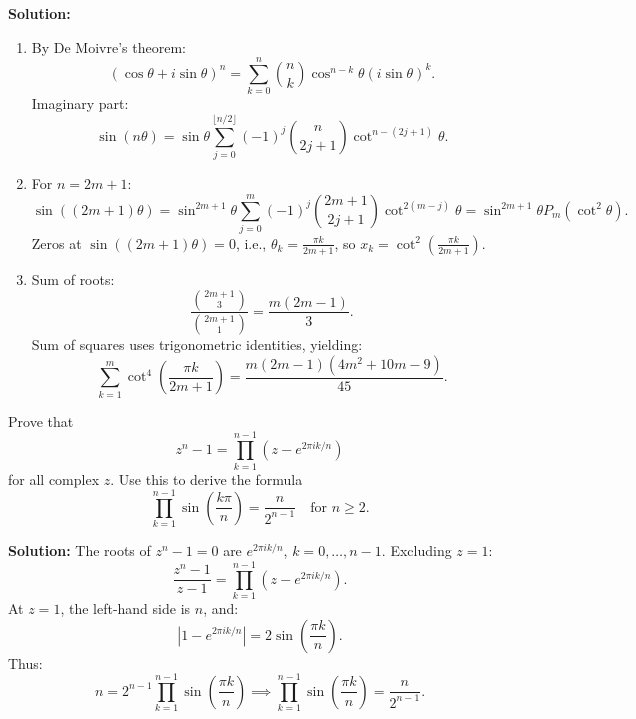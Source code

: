 \textbf{Solution:}
\begin{enumerate}[label=\textbf{(\alph*)}]
\item By De Moivre’s theorem:
\[
(\cos \theta + i \sin \theta)^n = \sum_{k=0}^n \binom{n}{k} \cos^{n-k} \theta (i \sin \theta)^k.
\]
Imaginary part:
\[
\sin(n\theta) = \sin \theta \sum_{j=0}^{\lfloor n/2 \rfloor} (-1)^j \binom{n}{2j+1} \cot^{n-(2j+1)} \theta.
\]
\item For \( n = 2m+1 \):
\[
\sin((2m+1)\theta) = \sin^{2m+1} \theta \sum_{j=0}^m (-1)^j \binom{2m+1}{2j+1} \cot^{2(m-j)} \theta = \sin^{2m+1} \theta P_m(\cot^2 \theta).
\]
Zeros at \( \sin((2m+1)\theta) = 0 \), i.e., \( \theta_k = \frac{\pi k}{2m+1} \), so \( x_k = \cot^2 \left( \frac{\pi k}{2m+1} \right) \).
\item Sum of roots:
\[
\frac{\binom{2m+1}{3}}{\binom{2m+1}{1}} = \frac{m(2m-1)}{3}.
\]
Sum of squares uses trigonometric identities, yielding:
\[
\sum_{k=1}^m \cot^4 \left( \frac{\pi k}{2m+1} \right) = \frac{m(2m-1)(4m^2 + 10m - 9)}{45}.
\]
\end{enumerate}

\begin{problembox}
Prove that
\[
z^n - 1 = \prod_{k=1}^{n-1} \left(z - e^{2\pi i k/n}\right)
\]
for all complex \( z \). Use this to derive the formula
\[
\prod_{k=1}^{n-1} \sin \left( \frac{k\pi}{n} \right) = \frac{n}{2^{n-1}} \quad \text{for } n \geq 2.
\]
\end{problembox}

\textbf{Solution:}
The roots of \( z^n - 1 = 0 \) are \( e^{2\pi i k/n} \), \( k = 0, \ldots, n-1 \). Excluding \( z = 1 \):
\[
\frac{z^n - 1}{z - 1} = \prod_{k=1}^{n-1} (z - e^{2\pi i k/n}).
\]
At \( z = 1 \), the left-hand side is \( n \), and:
\[
|1 - e^{2\pi i k/n}| = 2 \sin\left( \frac{\pi k}{n} \right).
\]
Thus:
\[
n = 2^{n-1} \prod_{k=1}^{n-1} \sin\left( \frac{\pi k}{n} \right) \implies \prod_{k=1}^{n-1} \sin\left( \frac{\pi k}{n} \right) = \frac{n}{2^{n-1}}.
\]

